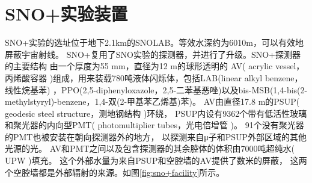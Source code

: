 \section{SNO+实验装置}\label{facility}

SNO+实验的选址位于地下2.1km的SNOLAB。等效水深约为6010m，可以有效地屏蔽宇宙射线。
SNO+复用了SNO实验的探测器，并进行了升级。SNO+探测器的主要结构
由一个厚度为55 mm，直径为12 m的球形透明的
AV( acrylic vessel，丙烯酸容器 )组成，用来装载780吨液体闪烁体，包括LAB(linear alkyl benzene，线性烷基苯)
，PPO(2,5-diphenyloxazole，2,5-二苯基恶唑)以及bis-MSB(1,4-bis(2-methylstyryl)-benzene，1,4-双(2-甲基苯乙烯基)苯)。
AV由直径17.8 m的PSUP( geodesic steel structure，测地钢结构 )环绕，
PSUP内设有9362个带有低活性玻璃和聚光器的内向型PMT( photomultiplier tubes，光电倍增管 )。
91个没有聚光器的PMT也被安装在朝向探测器外的地方，
以探测来自μ子和PSUP外部区域的其他光源的光。
AV和PMT之间以及包含探测器的其余腔体的体积由7000吨超纯水( UPW )填充。
这个外部水量为来自PSUP和空腔墙的AV提供了数米的屏蔽，
这两个空腔墙都是外部辐射的来源。如图\ref{fig:sno+facility}所示。

